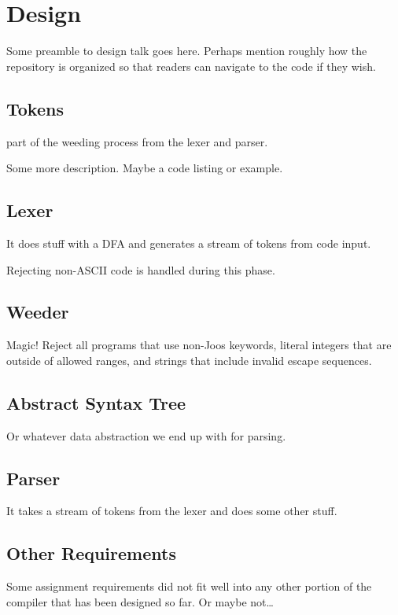 \documentclass[pdftex,12pt,a4paper]{article}
\begin{document}

\section{Design}

Some preamble to design talk goes here. Perhaps mention roughly how
the repository is organized so that readers can navigate to the code
if they wish.



\subsection{Tokens}
part of the weeding process from the lexer and parser.

Some more description. Maybe a code listing or example.


\subsection{Lexer}

It does stuff with a DFA and generates a stream of tokens from code
input.

Rejecting non-ASCII code is handled during this phase.


\subsection{Weeder}

Magic! Reject all programs that use non-Joos keywords, literal
integers that are outside of allowed ranges, and strings that include
invalid escape sequences.


\subsection{Abstract Syntax Tree}

Or whatever data abstraction we end up with for parsing.


\subsection{Parser}

It takes a stream of tokens from the lexer and does some other stuff.


\subsection{Other Requirements}

Some assignment requirements did not fit well into any other portion
of the compiler that has been designed so far. Or maybe not\ldots
\end{document}
